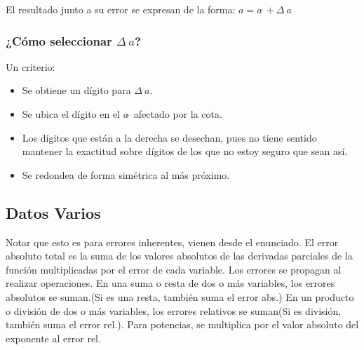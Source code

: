 El resultado junto a su error se expresan de la forma:
$a = a\tilde{~}+\Delta\ a$

\subsubsection{¿Cómo seleccionar $\Delta\ a$?}
Un criterio:
\begin{itemize}
    \item Se obtiene un dígito para $\Delta\ a$.
    \item Se ubica el dígito en el $a\tilde{~}$ afectado por la cota.
    \item Los dígitos que están a la derecha se desechan, pues no tiene sentido mantener la exactitud sobre dígitos de los que no estoy seguro que sean así.
    \item Se redondea de forma simétrica al más próximo.
\end{itemize}
\subsection{Datos Varios}
Notar que esto es para errores inherentes, vienen desde el enunciado.
El error absoluto total es la suma de los valores absolutos de las derivadas parciales de la función multiplicadas por el error de cada variable.
Los errores se propagan al realizar operaciones.
En una suma o resta de dos o más variables, los errores absolutos se suman.(Si es una resta, también suma el error abs.)
En un producto o división de dos o más variables, los errores relativos se suman(Si es división, también suma el error rel.).
Para potencias, se multiplica por el valor absoluto del exponente al error rel.